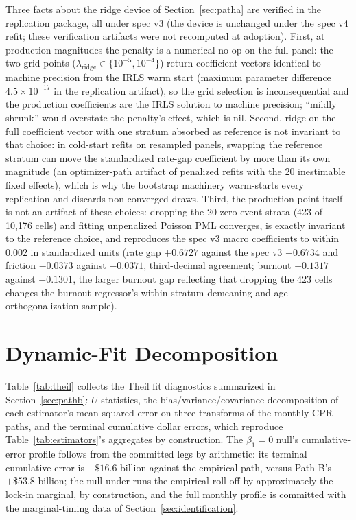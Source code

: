 \documentclass[12pt]{article}
\begin{document}
Three facts about the ridge device of Section~\ref{sec:patha} are verified in the replication package, all under spec v3 (the device is unchanged under the spec v4 refit; these verification artifacts were not recomputed at adoption). First, at production magnitudes the penalty is a numerical no-op on the full panel: the two grid points ($\lambda_{\mathrm{ridge}} \in \{10^{-5}, 10^{-4}\}$) return coefficient vectors identical to machine precision from the IRLS warm start (maximum parameter difference $4.5\times10^{-17}$ in the replication artifact), so the grid selection is inconsequential and the production coefficients are the IRLS solution to machine precision; ``mildly shrunk'' would overstate the penalty's effect, which is nil. Second, ridge on the full coefficient vector with one stratum absorbed as reference is not invariant to that choice: in cold-start refits on resampled panels, swapping the reference stratum can move the standardized rate-gap coefficient by more than its own magnitude (an optimizer-path artifact of penalized refits with the 20 inestimable fixed effects), which is why the bootstrap machinery warm-starts every replication and discards non-converged draws. Third, the production point itself is not an artifact of these choices: dropping the 20 zero-event strata (423 of 10,176 cells) and fitting unpenalized Poisson PML converges, is exactly invariant to the reference choice, and reproduces the spec v3 macro coefficients to within $0.002$ in standardized units (rate gap $+0.6727$ against the spec v3 $+0.6734$ and friction $-0.0373$ against $-0.0371$, third-decimal agreement; burnout $-0.1317$ against $-0.1301$, the larger burnout gap reflecting that dropping the 423 cells changes the burnout regressor's within-stratum demeaning and age-orthogonalization sample).

\section{Dynamic-Fit Decomposition}\label{app:theil}

Table~\ref{tab:theil} collects the Theil fit diagnostics summarized in Section~\ref{sec:pathb}: $U$ statistics, the bias/variance/covariance decomposition of each estimator's mean-squared error on three transforms of the monthly CPR paths, and the terminal cumulative dollar errors, which reproduce Table~\ref{tab:estimators}'s aggregates by construction. The $\beta_1 = 0$ null's cumulative-error profile follows from the committed legs by arithmetic: its terminal cumulative error is $-\$16.6$ billion against the empirical path, versus Path B's $+\$53.8$ billion; the null under-runs the empirical roll-off by approximately the lock-in marginal, by construction, and the full monthly profile is committed with the marginal-timing data of Section~\ref{sec:identification}.
\end{document}
